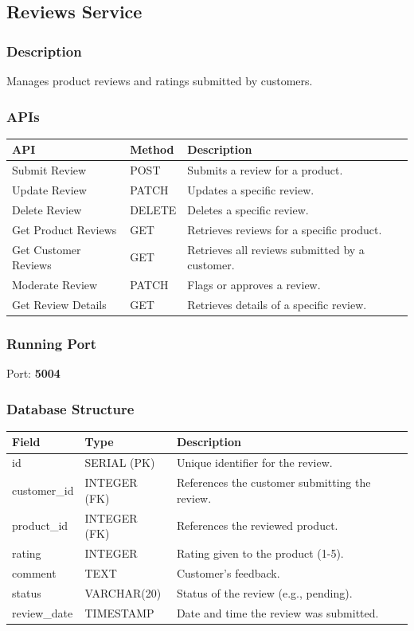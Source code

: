 \documentclass[a4paper,12pt]{article}
\begin{document}
\subsection{Reviews Service}
\subsubsection{Description}
Manages product reviews and ratings submitted by customers.

\subsubsection{APIs}
\begin{longtable}{|p{4cm}|p{2cm}|p{7cm}|}
\hline
\textbf{API} & \textbf{Method} & \textbf{Description} \\
\hline
Submit Review & POST & Submits a review for a product. \\
\hline
Update Review & PATCH & Updates a specific review. \\
\hline
Delete Review & DELETE & Deletes a specific review. \\
\hline
Get Product Reviews & GET & Retrieves reviews for a specific product. \\
\hline
Get Customer Reviews & GET & Retrieves all reviews submitted by a customer. \\
\hline
Moderate Review & PATCH & Flags or approves a review. \\
\hline
Get Review Details & GET & Retrieves details of a specific review. \\
\hline
\end{longtable}

\subsubsection{Running Port}
Port: \textbf{5004}

\subsubsection{Database Structure}
\begin{longtable}{|p{3cm}|p{3cm}|p{8cm}|}
\hline
\textbf{Field} & \textbf{Type} & \textbf{Description} \\
\hline
id & SERIAL (PK) & Unique identifier for the review. \\
\hline
customer\_id & INTEGER (FK) & References the customer submitting the review. \\
\hline
product\_id & INTEGER (FK) & References the reviewed product. \\
\hline
rating & INTEGER & Rating given to the product (1-5). \\
\hline
comment & TEXT & Customer's feedback. \\
\hline
status & VARCHAR(20) & Status of the review (e.g., pending). \\
\hline
review\_date & TIMESTAMP & Date and time the review was submitted. \\
\hline
\end{longtable}
\end{document}
